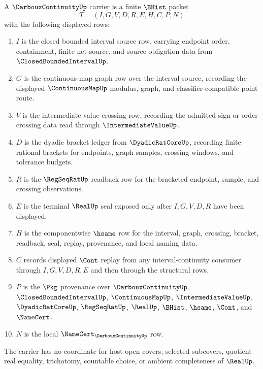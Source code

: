 \begin{definition}
\label{def:darboux-continuity-carrier}
A $\DarbouxContinuityUp$ carrier is a finite $\BHist$ packet
$$
T=(I,G,V,D,R,E,H,C,P,N)
$$
with the following displayed rows:
\begin{enumerate}
\item $I$ is the closed bounded interval source row, carrying endpoint order, containment, finite-net source, and source-obligation data from $\ClosedBoundedIntervalUp$.
\item $G$ is the continuous-map graph row over the interval source, recording the displayed $\ContinuousMapUp$ modulus, graph, and classifier-compatible point route.
\item $V$ is the intermediate-value crossing row, recording the admitted sign or order crossing data read through $\IntermediateValueUp$.
\item $D$ is the dyadic bracket ledger from $\DyadicRatCoreUp$, recording finite rational brackets for endpoints, graph samples, crossing windows, and tolerance budgets.
\item $R$ is the $\RegSeqRatUp$ readback row for the bracketed endpoint, sample, and crossing observations.
\item $E$ is the terminal $\RealUp$ seal exposed only after $I,G,V,D,R$ have been displayed.
\item $H$ is the componentwise $\hsame$ row for the interval, graph, crossing, bracket, readback, seal, replay, provenance, and local naming data.
\item $C$ records displayed $\Cont$ replay from any interval-continuity consumer through $I,G,V,D,R,E$ and then through the structural rows.
\item $P$ is the $\Pkg$ provenance over $\DarbouxContinuityUp$, $\ClosedBoundedIntervalUp$, $\ContinuousMapUp$, $\IntermediateValueUp$, $\DyadicRatCoreUp$, $\RegSeqRatUp$, $\RealUp$, $\BHist$, $\hsame$, $\Cont$, and $\NameCert$.
\item $N$ is the local $\NameCert_{\DarbouxContinuityUp}$ row.
\end{enumerate}
The carrier has no coordinate for host open covers, selected subcovers, quotient real equality, trichotomy, countable choice, or ambient completeness of $\RealUp$.
\end{definition}

